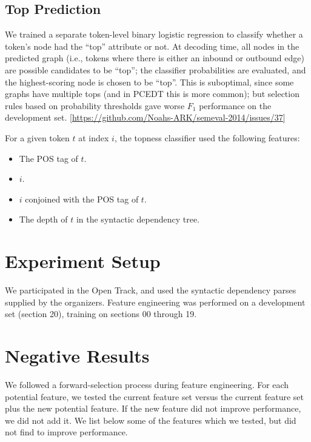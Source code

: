\documentclass[11pt]{article}
\newcommand{\codenote}[1]{\textcolor{PineGreen}{[#1]}}
\begin{document}
\subsection{Top Prediction} \label{s:top_model}

We trained a separate token-level binary logistic regression to classify
whether a token's node had the ``top'' attribute or not.
At decoding time, all nodes in the predicted graph (i.e., tokens where there is
either an inbound or outbound edge) are possible candidates to be ``top'';
the classifier probabilities are evaluated, and the highest-scoring node is
chosen to be ``top''.
This is suboptimal, since some graphs have multiple tops (and in PCEDT this is
more common);
but selection rules based on probability thresholds gave worse $F_1$
performance on the development set. \codenote{\url{https://github.com/Noahs-ARK/semeval-2014/issues/37}}

For a given token $t$ at index $i$, the topness classifier used the following
features:
\begin{itemize}
\item The POS tag of $t$.
\item $i$.
\item $i$ conjoined with the POS tag of $t$.
\item The depth of $t$ in the syntactic dependency tree. 
\end{itemize}

\section{Experiment Setup}

We participated in the Open Track, and used the syntactic dependency parses supplied by the organizers.  Feature engineering was performed on a development set (section 20), training on sections 00 through 19.

\section{Negative Results}
\label{s:badfeatures}

We followed a forward-selection process during feature engineering.
For each potential feature, we tested the current feature set versus the current
feature set plus the new potential feature.
If the new feature did not improve performance, we did not add it.
We list below some of the features which we tested, but did not find to improve
performance.
\end{document}
